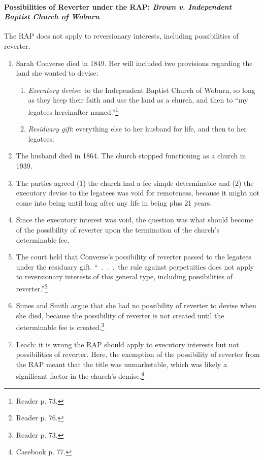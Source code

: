 \paragraph{Possibilities of Reverter under the RAP: \emph{Brown v. Independent 
Baptist Church of Woburn}}

The RAP does not apply to reversionary interests, including possibilities of 
reverter.

\begin{enumerate}
    \item Sarah Converse died in 1849. Her will included two provisions 
    regarding the land she wanted to devise:
    \begin{enumerate}
        \item \emph{Executory devise}: to the Independent Baptist Church of 
        Woburn, so long as they keep their faith and use the land as a church, 
        and then to ``my legatees hereinafter named.''\footnote{Reader p. 73.} 
        \item \emph{Residuary gift}: everything else to her husband for life, 
        and then to her legatees.
    \end{enumerate}
    \item The husband died in 1864. The church stopped functioning as a church 
    in 1939.
    \item The parties agreed (1) the church had a fee simple determinable and 
    (2) the executory devise to the legatees was void for remoteness, because 
    it might not come into being until long after any life in being plus 21 
    years.
    \item Since the executory interest was void, the question was what should 
    become of the possibility of reverter upon the termination of the church's 
    determinable fee.
    \item The court held that Converse's possibility of reverter passed to the 
    legatees under the residuary gift. ``~.~.~.~the rule against perpetuities 
    does not apply to reversionary interests of this general type, including 
    possibilities of reverter.''\footnote{Reader p. 76.}
    \item Simes and Smith argue that she had no possibility of reverter to 
    devise when she died, because the possibility of reverter is not created 
    until the determinable fee is created.\footnote{Reader p. 73.}
    \item Leach: it is wrong the RAP should apply to executory interests but 
    not possibilities of reverter. Here, the exemption of the possibility of 
    reverter from the RAP meant that the title was unmarketable, which was 
    likely a significant factor in the church's demise.\footnote{Casebook p. 
    77.}
\end{enumerate}


